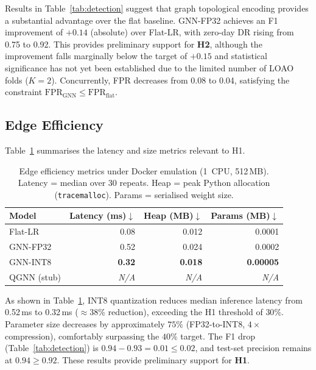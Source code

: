 \documentclass[conference]{IEEEtran}
\begin{document}
Results in Table~\ref{tab:detection} suggest that graph topological encoding
provides a substantial advantage over the flat baseline.  GNN-FP32 achieves an
F1 improvement of $+0.14$ (absolute) over Flat-LR, with zero-day DR rising
from 0.75 to 0.92.  This provides preliminary support for \textbf{H2},
although the improvement falls marginally below the target of $+0.15$ and
statistical significance has not yet been established due to the limited number
of LOAO folds ($K{=}2$).  Concurrently, FPR decreases from 0.08 to 0.04,
satisfying the constraint $\mathrm{FPR}_{\mathrm{GNN}} \le
\mathrm{FPR}_{\mathrm{flat}}$.

\subsection{Edge Efficiency}

Table~\ref{tab:efficiency} summarises the latency and size metrics relevant to
H1.

\begin{table}[t]
\centering
\caption{Edge efficiency metrics under Docker emulation (1~CPU, 512\,MB).
Latency = median over 30 repeats.  Heap = peak Python allocation
(\texttt{tracemalloc}).  Params = serialised weight size.}
\label{tab:efficiency}
\renewcommand{\arraystretch}{1.15}
\begin{tabular}{@{}l r r r@{}}
\toprule
\textbf{Model} & \textbf{Latency (ms)}$\downarrow$
               & \textbf{Heap (MB)}$\downarrow$
               & \textbf{Params (MB)}$\downarrow$ \\
\midrule
Flat-LR         & 0.08 & 0.012 & 0.0001 \\
GNN-FP32        & 0.52 & 0.024 & 0.0002 \\
GNN-INT8        & \textbf{0.32} & \textbf{0.018} & \textbf{0.00005} \\
QGNN (stub)     & \textit{N/A} & \textit{N/A} & \textit{N/A} \\
\bottomrule
\end{tabular}
\end{table}

As shown in Table~\ref{tab:efficiency}, INT8 quantization reduces median
inference latency from 0.52\,ms to 0.32\,ms (${\approx}38\%$ reduction),
exceeding the H1 threshold of $30\%$.  Parameter size decreases by approximately
$75\%$ (FP32-to-INT8, $4{\times}$ compression), comfortably surpassing the
$40\%$ target.  The F1 drop (Table~\ref{tab:detection}) is
$0.94 - 0.93 = 0.01 \le 0.02$, and test-set precision remains at
$0.94 \ge 0.92$.  These results provide preliminary support for \textbf{H1}.
\end{document}
